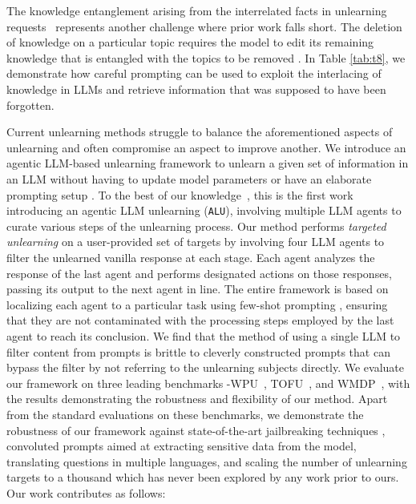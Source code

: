 The knowledge entanglement arising from the interrelated facts in unlearning requests~\cite{wu2024evaluating} represents another challenge where prior work falls short. The deletion of knowledge on a particular topic requires the model to edit its remaining knowledge that is entangled with the topics to be removed \cite{maini2024tofu, lynch2024eight, eldan2023whosharrypotterapproximate}. In Table \ref{tab:t8}, we demonstrate how careful prompting can be used to exploit the interlacing of knowledge in LLMs and retrieve information that was supposed to have been forgotten.\par

Current unlearning methods struggle to balance the aforementioned aspects of unlearning and often compromise an aspect to improve another. We introduce an agentic LLM-based unlearning framework to unlearn a given set of information in an LLM without having to update model parameters or have an elaborate prompting setup \cite{pawelczyk2023context}. To the best of our knowledge~\cite{liu2024rethinking}, this is the first work introducing an agentic LLM unlearning (\texttt{ALU}), involving multiple LLM agents to curate various steps of the unlearning process. Our method performs \emph{targeted unlearning} \cite{liu2024revisitingwhosharrypotter} on a user-provided set of targets by involving four LLM agents to filter the unlearned vanilla response at each stage. Each agent analyzes the response of the last agent and performs designated actions on those responses, passing its output to the next agent in line. The entire framework is based on localizing each agent to a particular task using few-shot prompting \cite{brown2020languagemodelsfewshotlearners}, ensuring that they are not contaminated with the processing steps employed by the last agent to reach its conclusion. We find that the method of using a single LLM to filter content from prompts \cite{thaker2024guardrail} is brittle to cleverly constructed prompts that can bypass the filter by not referring to the unlearning subjects directly. We evaluate our framework on three leading benchmarks -\textsc{WPU}~\cite{liu2024revisitingwhosharrypotter},
\textsc{TOFU}~\cite{maini2024tofu}, and \textsc{WMDP}~\cite{li2024wmdpbenchmarkmeasuringreducing}, with the results demonstrating the robustness and flexibility of our method. Apart from the standard evaluations on these benchmarks, we demonstrate the robustness of our framework against state-of-the-art jailbreaking techniques \cite{anil2024many, lynch2024eight}, convoluted prompts aimed at extracting sensitive data from the model, translating questions in multiple languages, and scaling the number of unlearning targets to a thousand which has never been explored by any work prior to ours. Our work contributes as follows:

